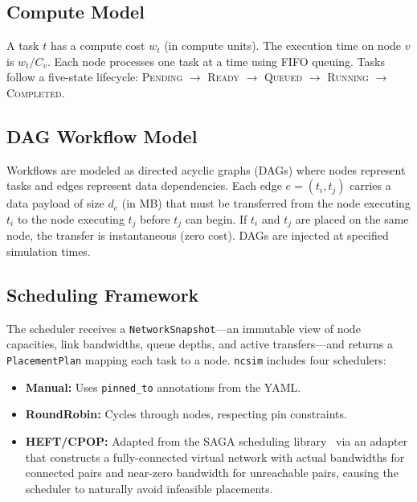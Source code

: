 \documentclass[conference]{IEEEtran}
\newcommand{\ncsim}{\texttt{ncsim}}
\begin{document}
\subsection{Compute Model}

A task $t$ has a compute cost $w_t$ (in compute units).  The execution time
on node $v$ is $w_t / C_v$.  Each node processes one task at a time using
FIFO queuing.  Tasks follow a five-state lifecycle: \textsc{Pending}
$\rightarrow$ \textsc{Ready} $\rightarrow$ \textsc{Queued} $\rightarrow$
\textsc{Running} $\rightarrow$ \textsc{Completed}.

\subsection{DAG Workflow Model}

Workflows are modeled as directed acyclic graphs (DAGs) where nodes represent
tasks and edges represent data dependencies.  Each edge $e = (t_i, t_j)$
carries a data payload of size $d_e$ (in MB) that must be transferred from
the node executing $t_i$ to the node executing $t_j$ before $t_j$ can begin.
If $t_i$ and $t_j$ are placed on the same node, the transfer is
instantaneous (zero cost).  DAGs are injected at specified simulation times.

\subsection{Scheduling Framework}

The scheduler receives a \texttt{NetworkSnapshot}---an immutable view of
node capacities, link bandwidths, queue depths, and active transfers---and
returns a \texttt{PlacementPlan} mapping each task to a node.  \ncsim{}
includes four schedulers:

\begin{itemize}[itemsep=1pt,leftmargin=*]
\item \textbf{Manual:} Uses \texttt{pinned\_to} annotations from the YAML.
\item \textbf{RoundRobin:} Cycles through nodes, respecting pin constraints.
\item \textbf{HEFT/CPOP:} Adapted from the SAGA scheduling library~\cite{heft}
  via an adapter that constructs a fully-connected virtual network with actual
  bandwidths for connected pairs and near-zero bandwidth for unreachable
  pairs, causing the scheduler to naturally avoid infeasible placements.
\end{itemize}
\end{document}
